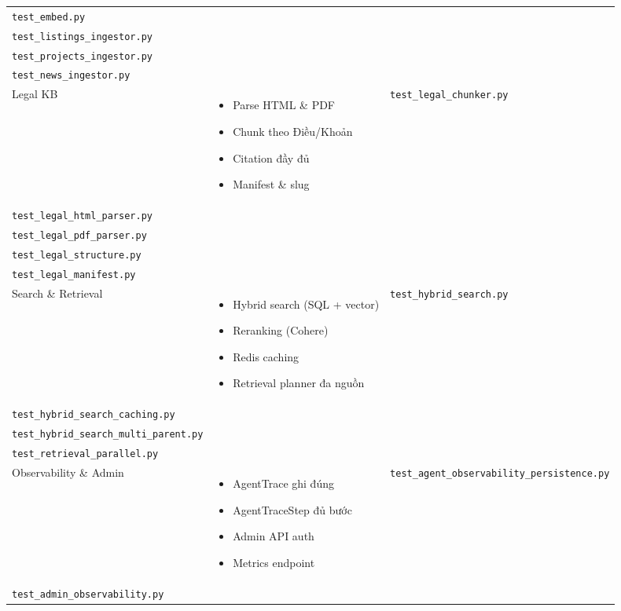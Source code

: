 \begin{longtable}{|p{3.5cm}|p{5cm}|p{5cm}|}
    \texttt{test\_embed.py} \\
    \texttt{test\_listings\_ingestor.py} \\
    \texttt{test\_projects\_ingestor.py} \\
    \texttt{test\_news\_ingestor.py} \\
    \hline
    Legal KB & 
    \begin{itemize}
        \item Parse HTML \& PDF
        \item Chunk theo Điều/Khoản
        \item Citation đầy đủ
        \item Manifest \& slug
    \end{itemize} & 
    \texttt{test\_legal\_chunker.py} \\
    \texttt{test\_legal\_html\_parser.py} \\
    \texttt{test\_legal\_pdf\_parser.py} \\
    \texttt{test\_legal\_structure.py} \\
    \texttt{test\_legal\_manifest.py} \\
    \hline
    Search \& Retrieval & 
    \begin{itemize}
        \item Hybrid search (SQL + vector)
        \item Reranking (Cohere)
        \item Redis caching
        \item Retrieval planner đa nguồn
    \end{itemize} & 
    \texttt{test\_hybrid\_search.py} \\
    \texttt{test\_hybrid\_search\_caching.py} \\
    \texttt{test\_hybrid\_search\_multi\_parent.py} \\
    \texttt{test\_retrieval\_parallel.py} \\
    \hline
    Observability \& Admin & 
    \begin{itemize}
        \item AgentTrace ghi đúng
        \item AgentTraceStep đủ bước
        \item Admin API auth
        \item Metrics endpoint
    \end{itemize} & 
    \texttt{test\_agent\_observability\_persistence.py} \\
    \texttt{test\_admin\_observability.py} \\

\end{longtable}

